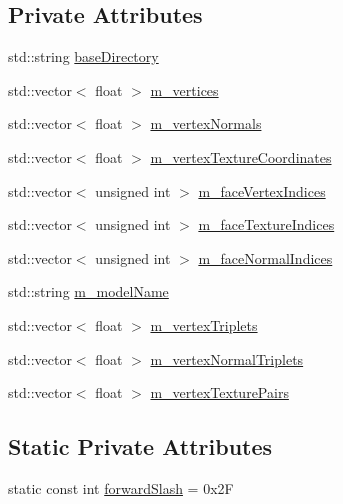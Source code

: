\subsection*{Private Attributes}
\begin{DoxyCompactItemize}
\item 
std\+::string \hyperlink{class_model_reader_a93d23aa8d615c4c59dd45112e09273fc}{base\+Directory}
\item 
std\+::vector$<$ float $>$ \hyperlink{class_model_reader_a31bedc9d7bcfcb8385dab2538a9fe901}{m\+\_\+vertices}
\item 
std\+::vector$<$ float $>$ \hyperlink{class_model_reader_adaf9095e7b9d76761142e1addcb7b203}{m\+\_\+vertex\+Normals}
\item 
std\+::vector$<$ float $>$ \hyperlink{class_model_reader_a650f9b20143951a5baa47d35b6b069ce}{m\+\_\+vertex\+Texture\+Coordinates}
\item 
std\+::vector$<$ unsigned int $>$ \hyperlink{class_model_reader_a9c06d6c9bbadaebcb4c9e252c1ee91f9}{m\+\_\+face\+Vertex\+Indices}
\item 
std\+::vector$<$ unsigned int $>$ \hyperlink{class_model_reader_ae39f1d039babc141dd5762cce97849e7}{m\+\_\+face\+Texture\+Indices}
\item 
std\+::vector$<$ unsigned int $>$ \hyperlink{class_model_reader_a8063140b52f022f32ff26e5ef504f1e4}{m\+\_\+face\+Normal\+Indices}
\item 
std\+::string \hyperlink{class_model_reader_a5adca8aa3aeda91670b3d5d080165b2f}{m\+\_\+model\+Name}
\item 
std\+::vector$<$ float $>$ \hyperlink{class_model_reader_a383b63a003d95c976c2abdf6acd96f90}{m\+\_\+vertex\+Triplets}
\item 
std\+::vector$<$ float $>$ \hyperlink{class_model_reader_ac53d337835121e29acf367aee4e4d407}{m\+\_\+vertex\+Normal\+Triplets}
\item 
std\+::vector$<$ float $>$ \hyperlink{class_model_reader_a1645f9266005e6ba037ff18fd95a14e2}{m\+\_\+vertex\+Texture\+Pairs}
\end{DoxyCompactItemize}
\subsection*{Static Private Attributes}
\begin{DoxyCompactItemize}
\item 
static const int \hyperlink{class_model_reader_a869fdfcdef0938fd7c06a0c35ee53488}{forward\+Slash} = 0x2F
\end{DoxyCompactItemize}


